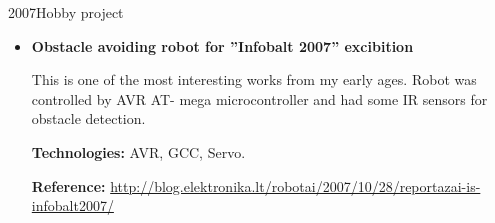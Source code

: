 \documentclass[12]{article}
\begin{document}
\hobbyproject
{2007}{Hobby project}
\begin{itemize}[leftmargin=2cm,topsep=-0.5cm]

\item \textbf{Obstacle avoiding robot for ”Infobalt 2007” excibition}

This is one of the most interesting works from my early ages. Robot was controlled by AVR AT-
mega microcontroller and had some IR sensors for obstacle detection.

\rule{0mm}{5mm}\textbf{Technologies:} AVR, GCC, Servo.

\rule{0mm}{5mm}\textbf{Reference:} \url{http://blog.elektronika.lt/robotai/2007/10/28/reportazai-is-infobalt2007/}

\end{itemize}
\end{document}
